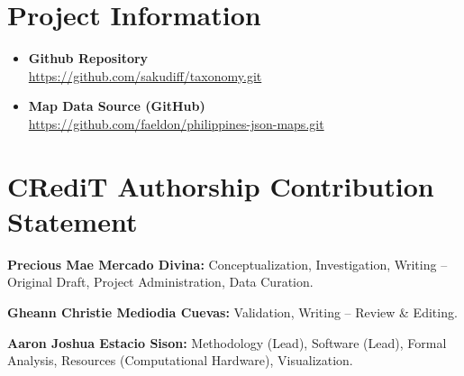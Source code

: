 \documentclass[acmtog, nonacm]{acmart}
\begin{document}
\section{Project Information}

\begin{itemize}    
    \item \textbf{Github Repository} \\
    \url{https://github.com/sakudiff/taxonomy.git}
    
    \item \textbf{Map Data Source (GitHub)} \\
    \url{https://github.com/faeldon/philippines-json-maps.git}
\end{itemize}


\section*{CRediT Authorship Contribution Statement}

\textbf{Precious Mae Mercado Divina:} Conceptualization, Investigation, Writing -- Original Draft, Project Administration, Data Curation.

\textbf{Gheann Christie Mediodia Cuevas:} Validation, Writing -- Review \& Editing.

\textbf{Aaron Joshua Estacio Sison:} Methodology (Lead), Software (Lead), Formal Analysis, Resources (Computational Hardware), Visualization.
\end{document}
